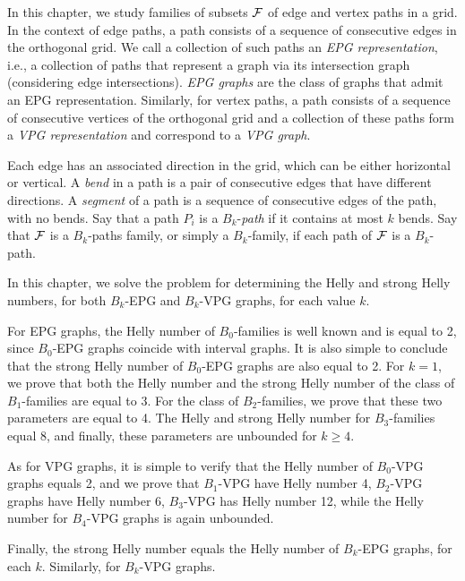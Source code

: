 In this chapter, we study families of subsets $\cal{F}$ of edge and vertex paths in a grid. In the context of edge paths, a path consists of a sequence of consecutive edges in the orthogonal grid. We call a collection of such paths an {\it EPG representation}, i.e., a collection of paths that represent a graph via its intersection graph (considering edge intersections). {\it EPG graphs} are the class of graphs that admit an EPG representation.
Similarly, for vertex paths, a path consists of a sequence of consecutive vertices of the orthogonal grid and a collection of
these paths form a {\it VPG representation} and correspond to a {\it VPG graph}. 

Each edge has an associated direction in the grid, which can be either horizontal or vertical. A {\it bend} in a path is a pair of consecutive edges that have different directions. A {\it segment} of a path is a sequence of consecutive edges of the path, with no bends. Say that a path $P_i$ is a $B_k$-{\it path} if it contains at most $k$ bends. Say that $\cal {F}$ is a  $B_k$-paths family, or simply a $B_k$-family,  if each path of $\cal {F}$ is a $B_k$-path. 

 In this chapter, we solve the problem for determining the Helly and strong Helly numbers, for both $B_k$-EPG and $B_k$-VPG graphs, for each value $k$.

For EPG graphs,  the Helly number of  $B_0$-families is well known and is equal to 2, since $B_0$-EPG graphs coincide with interval graphs. It is also simple to conclude that the strong Helly number of $B_0$-EPG graphs are also equal to 2. For $k = 1$,  
we prove that both the Helly number and the strong Helly number of the class of $B_1$-families are equal to 3. For the class of $B_2$-families, we prove that these two parameters are equal to 4. The Helly and strong Helly number for $B_3$-families equal 8, and finally, these parameters are unbounded for $k \geq 4$. 

As for VPG graphs, it is simple to verify that the Helly number of $B_0$-VPG graphs equals 2, and we prove that $B_1$-VPG have Helly number 4, $B_2$-VPG graphs have Helly number 6, $B_3$-VPG has Helly number 12, while the Helly number for $B_4$-VPG graphs is again unbounded. 

Finally, the strong Helly number equals the Helly number of $B_k$-EPG graphs, for each $k$. Similarly, for $B_k$-VPG graphs. 

